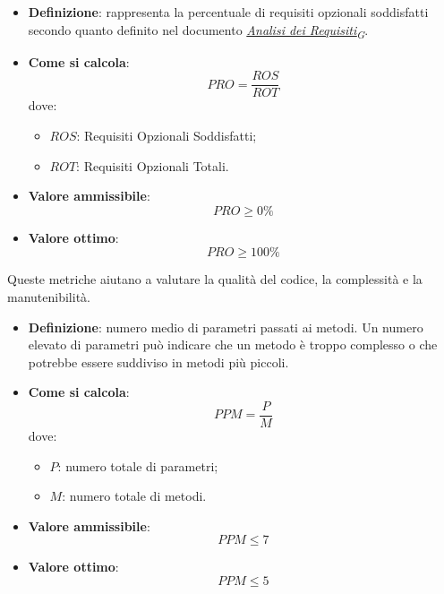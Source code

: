 \begin{itemize}
	\item \textbf{Definizione}: rappresenta la percentuale di requisiti opzionali soddisfatti secondo quanto definito nel documento \href{https://7last.github.io/docs/rtb/documentazione-interna/glossario\#analisi-dei-requisiti}{\textit{Analisi dei Requisiti\textsubscript{G}}}.
	\item \textbf{Come si calcola}: \begin{equation*}PRO = \frac{ROS}{ROT}\end{equation*} dove:
		\begin{itemize}
			\item $ROS$: Requisiti Opzionali Soddisfatti;
			\item $ROT$: Requisiti Opzionali Totali.
		\end{itemize}
	\item \textbf{Valore ammissibile}: \begin{equation*}PRO \geq 0\%\end{equation*}
	\item \textbf{Valore ottimo}: \begin{equation*}PRO \geq 100\%\end{equation*}
\end{itemize}



Queste metriche aiutano a valutare la qualità del codice, la complessità e la manutenibilità.

\begin{itemize}
	\item \textbf{Definizione}: numero medio di parametri passati ai metodi. Un numero elevato di parametri può indicare che un metodo è troppo complesso o che potrebbe essere suddiviso in metodi più piccoli.
	\item \textbf{Come si calcola}: \begin{equation*}PPM = \frac{P}{M}\end{equation*} dove:
		\begin{itemize}
			\item $P$: numero totale di parametri;
			\item $M$: numero totale di metodi.
		\end{itemize}
	\item \textbf{Valore ammissibile}: \begin{equation*}PPM \leq 7\end{equation*}
	\item \textbf{Valore ottimo}: \begin{equation*}PPM \leq 5\end{equation*}
\end{itemize}

